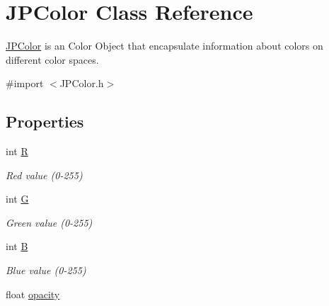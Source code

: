 \hypertarget{interface_j_p_color}{
\section{JPColor Class Reference}
\label{interface_j_p_color}
}


\hyperlink{interface_j_p_color}{JPColor} is an Color Object that encapsulate information about colors on different color spaces.  




{\ttfamily \#import $<$JPColor.h$>$}

\subsection*{Properties}
\begin{DoxyCompactItemize}
\item 
\hypertarget{interface_j_p_color_a5f08f4731c881872d34b7e18546bedb3}{
int \hyperlink{interface_j_p_color_a5f08f4731c881872d34b7e18546bedb3}{R}}
\label{interface_j_p_color_a5f08f4731c881872d34b7e18546bedb3}

\begin{DoxyCompactList}\small\item\em Red value (0-\/255) \item\end{DoxyCompactList}\item 
\hypertarget{interface_j_p_color_a6b7861ca88763bb2baef53e3afc04e32}{
int \hyperlink{interface_j_p_color_a6b7861ca88763bb2baef53e3afc04e32}{G}}
\label{interface_j_p_color_a6b7861ca88763bb2baef53e3afc04e32}

\begin{DoxyCompactList}\small\item\em Green value (0-\/255) \item\end{DoxyCompactList}\item 
\hypertarget{interface_j_p_color_a1e438555e86971a216f05bd8b4873d4a}{
int \hyperlink{interface_j_p_color_a1e438555e86971a216f05bd8b4873d4a}{B}}
\label{interface_j_p_color_a1e438555e86971a216f05bd8b4873d4a}

\begin{DoxyCompactList}\small\item\em Blue value (0-\/255) \item\end{DoxyCompactList}\item 
\hypertarget{interface_j_p_color_a0fce04992ae5d5c4e90468f7dd9717f2}{
float \hyperlink{interface_j_p_color_a0fce04992ae5d5c4e90468f7dd9717f2}{opacity}}
\label{interface_j_p_color_a0fce04992ae5d5c4e90468f7dd9717f2}


\end{DoxyCompactItemize}
